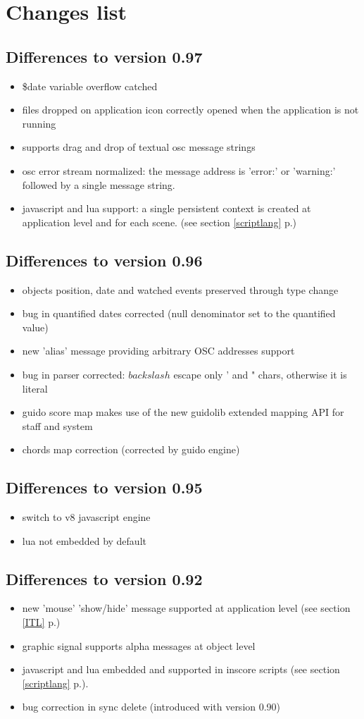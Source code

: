\documentclass[a4paper,twoside]{report}
\newcommand{\toplevel}[1]	{\chapter{#1}}
\newcommand{\sublevel}[1]	{\section{#1}}
\newcommand{\fullref}[1]	{\ref{#1} p.\pageref{#1}}
\begin{document}
\toplevel{ Changes list}


\sublevel{Differences to version 0.97}
\begin{itemize}
\item \$date variable overflow catched
\item files dropped on application icon correctly opened when the application is not running
\item supports drag and drop of textual osc message strings
\item osc error stream normalized: the message address is 'error:' or 'warning:'
   followed by a single message string.
\item javascript and lua support: a single persistent context is created at application level and for each scene. 
(see section \fullref{scriptlang})
\end{itemize}

\sublevel{Differences to version 0.96}
\begin{itemize}
\item  objects position, date and watched events preserved through type change
\item  bug in quantified dates corrected (null denominator set to the quantified value)
\item  new 'alias' message providing arbitrary OSC addresses support
\item  bug in parser corrected: $backslash$ escape only ' and " chars, otherwise it is literal
\item  guido score map makes use of the new guidolib extended mapping API for staff and system
\item  chords map correction (corrected by guido engine) 
\end{itemize}

\sublevel{Differences to version 0.95}
\begin{itemize}
\item switch to v8 javascript engine
\item lua not embedded by default
\end{itemize}

\sublevel{Differences to version 0.92}
\begin{itemize}
\item new 'mouse' 'show/hide' message supported at application level (see section \fullref{ITL})
\item graphic signal supports alpha messages at object level
\item javascript and lua embedded and supported in inscore scripts  (see section \fullref{scriptlang}).
\item bug correction in sync delete (introduced with version 0.90)
\end{itemize}
\end{document}
